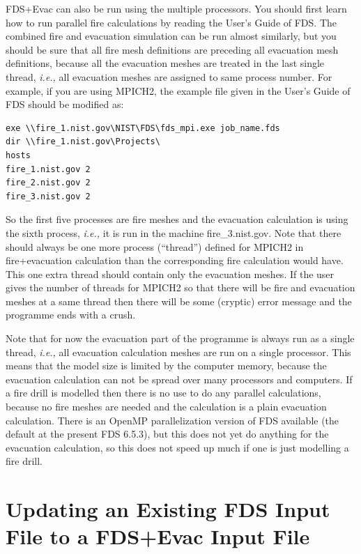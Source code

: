 \documentclass[12pt,a4paper,final,twoside]{stylevk}
\begin{document}
FDS+Evac can also be run using the multiple processors.  You should
first learn how to run parallel fire calculations by reading the
User's Guide of FDS.  The combined fire and evacuation simulation can
be run almost similarly, but you should be sure that all fire mesh
definitions are preceding all evacuation mesh definitions, because all
the evacuation meshes are treated in the last single thread,
\emph{i.e.,} all evacuation meshes are assigned to same process
number.  For example, if you are using MPICH2, the example
 file given in the User's Guide of FDS should be
modified as:
\begin{verbatim}
exe \\fire_1.nist.gov\NIST\FDS\fds_mpi.exe job_name.fds
dir \\fire_1.nist.gov\Projects\
hosts
fire_1.nist.gov 2
fire_2.nist.gov 2
fire_3.nist.gov 2
\end{verbatim}
So the first five processes are fire meshes and the evacuation
calculation is using the sixth process, \emph{i.e.,} it is run in the
machine fire\_3.nist.gov.  Note that there should always be one more
process (``thread'') defined for MPICH2 in fire+evacuation calculation
than the corresponding fire calculation would have.  This one extra
thread should contain only the evacuation meshes.  If the user gives
the number of threads for MPICH2 so that there will be fire and
evacuation meshes at a same thread then there will be some (cryptic)
error message and the programme ends with a crush.


Note that for now the evacuation part of the programme is always run
as a single thread, \emph{i.e.,} all evacuation calculation meshes are
run on a single processor.  This means that the model size is limited
by the computer memory, because the evacuation calculation can not be
spread over many processors and computers.  If a fire drill is
modelled then there is no use to do any parallel calculations, because
no fire meshes are needed and the calculation is a plain evacuation
calculation.  There is an OpenMP parallelization version of FDS
available (the default at the present FDS 6.5.3), but this does not
yet do anything for the evacuation calculation, so this does not speed
up much if one is just modelling a fire drill.


\section{Updating an Existing FDS Input File to a FDS+Evac Input
  File}\label{Sec_UpdatingInput} 
\end{document}
